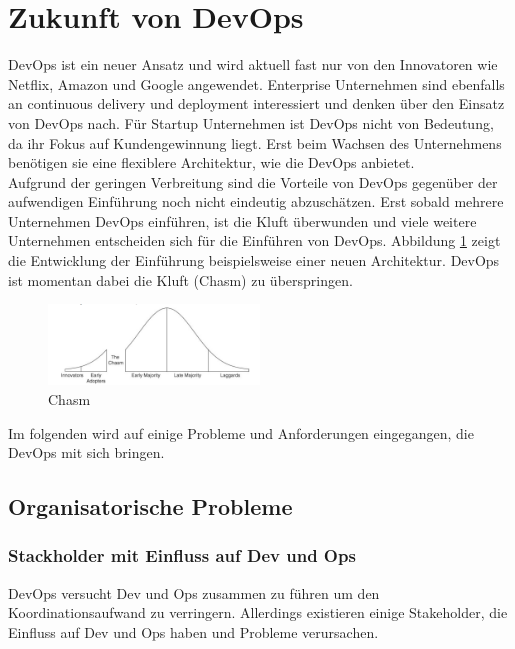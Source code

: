 \section{Zukunft von DevOps}

DevOps ist ein neuer Ansatz und wird aktuell fast nur von den Innovatoren wie Netflix, Amazon und Google angewendet. Enterprise Unternehmen sind ebenfalls an continuous delivery und deployment interessiert und denken über den Einsatz von DevOps nach. Für Startup Unternehmen ist DevOps nicht von Bedeutung, da ihr Fokus auf Kundengewinnung liegt. Erst beim Wachsen des Unternehmens benötigen sie eine flexiblere Architektur, wie die DevOps anbietet. \\
Aufgrund der geringen Verbreitung sind die Vorteile von DevOps gegenüber der aufwendigen Einführung noch nicht eindeutig abzuschätzen. Erst sobald mehrere Unternehmen DevOps einführen, ist die Kluft überwunden und viele weitere Unternehmen entscheiden sich für die Einführen von DevOps. Abbildung \ref{Chasm} zeigt die Entwicklung der Einführung beispielsweise einer neuen Architektur. DevOps ist momentan dabei die Kluft (Chasm) zu überspringen. 

\begin{figure}[htbp]
  \centering
  \includegraphics[width=0.5\textwidth]{pictures/chasm.png}
	\caption{Chasm}
	\label{Chasm}
\end{figure} 

Im folgenden wird auf einige Probleme und Anforderungen eingegangen, die DevOps mit sich bringen.

\subsection{Organisatorische Probleme}

\subsubsection{Stackholder mit Einfluss auf Dev und Ops}
DevOps versucht Dev und Ops zusammen zu führen um den Koordinationsaufwand zu verringern. Allerdings existieren einige Stakeholder, die Einfluss auf Dev und Ops haben und Probleme verursachen.\\

